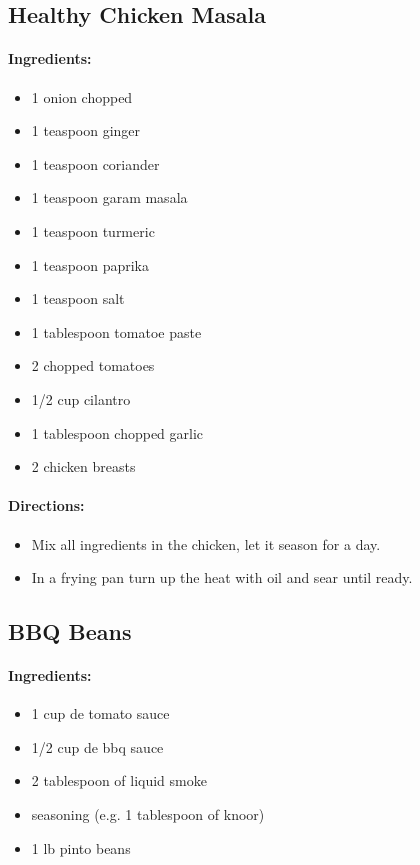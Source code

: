 \documentclass{article}
\begin{document}
\subsection{Healthy Chicken Masala}

\paragraph{Ingredients:}
\begin{itemize}
    \item 1 onion chopped
    \item 1 teaspoon ginger
    \item 1 teaspoon coriander
    \item 1 teaspoon garam masala
    \item 1 teaspoon turmeric
    \item 1 teaspoon paprika
    \item 1 teaspoon salt
    \item 1 tablespoon tomatoe paste
    \item 2 chopped tomatoes
    \item 1/2 cup cilantro
    \item 1 tablespoon chopped garlic
    \item 2 chicken breasts
\end{itemize}

\paragraph{Directions:}
\begin{itemize}
    \item Mix all ingredients in the chicken, let it season for a day.
    \item In a frying pan turn up the heat with oil and sear until ready.
\end{itemize}

\subsection{BBQ Beans}

\paragraph{Ingredients:}
\begin{itemize}
    \item 1 cup de tomato sauce
    \item 1/2 cup de bbq sauce
    \item 2 tablespoon of liquid smoke
    \item seasoning (e.g. 1 tablespoon of knoor)
    \item 1 lb pinto beans
\end{itemize}
\end{document}
